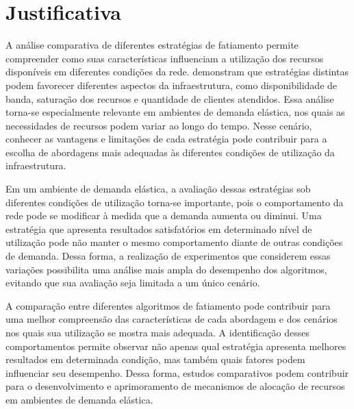 \section{Justificativa}

A análise comparativa de diferentes estratégias de fatiamento permite compreender como suas características influenciam a utilização dos recursos disponíveis em diferentes condições da rede.  demonstram que estratégias distintas podem favorecer diferentes aspectos da infraestrutura, como disponibilidade de banda, saturação dos recursos e quantidade de clientes atendidos. Essa análise torna-se especialmente relevante em ambientes de demanda elástica, nos quais as necessidades de recursos podem variar ao longo do tempo. Nesse cenário, conhecer as vantagens e limitações de cada estratégia pode contribuir para a escolha de abordagens mais adequadas às diferentes condições de utilização da infraestrutura.

Em um ambiente de demanda elástica, a avaliação dessas estratégias sob diferentes condições de utilização torna-se importante, pois o comportamento da rede pode se modificar à medida que a demanda aumenta ou diminui. Uma estratégia que apresenta resultados satisfatórios em determinado nível de utilização pode não manter o mesmo comportamento diante de outras condições de demanda. Dessa forma, a realização de experimentos que considerem essas variações possibilita uma análise mais ampla do desempenho dos algoritmos, evitando que sua avaliação seja limitada a um único cenário.

A comparação entre diferentes algoritmos de fatiamento pode contribuir para uma melhor compreensão das características de cada abordagem e dos cenários nos quais sua utilização se mostra mais adequada. A identificação desses comportamentos permite observar não apenas qual estratégia apresenta melhores resultados em determinada condição, mas também quais fatores podem influenciar seu desempenho. Dessa forma, estudos comparativos podem contribuir para o desenvolvimento e aprimoramento de mecanismos de alocação de recursos em ambientes de demanda elástica.